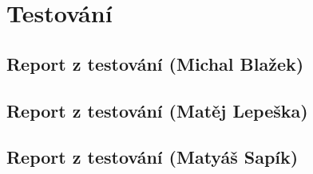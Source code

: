 \documentclass[a4paper, 11pt]{article}
\begin{document}
\section{Testování}

\subsection{Report z testování (Michal Blažek)}


\subsection{Report z testování (Matěj Lepeška)}


\subsection{Report z testování (Matyáš Sapík)}

\end{document}
